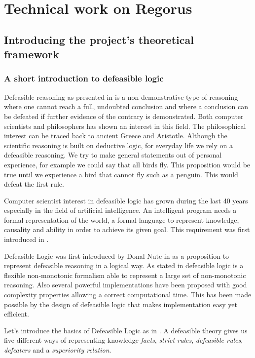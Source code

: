 \documentclass[10pt]{report}
\begin{document}
\newpage
\chapter{Technical work on Regorus}
\section{Introducing the project's theoretical framework}
\subsection{A short introduction to defeasible logic}

Defeasible reasoning as presented in \autocite{koons_defeasible_2005} is a non-demonstrative type of reasoning where one cannot reach a full, undoubted conclusion and where a conclusion can be defeated if further evidence of the contrary is demonstrated. Both computer scientists and philosophers has shown an interest in this field. The philosophical interest can be traced back to ancient Greece and Aristotle. Although the scientific reasoning is built on deductive logic, for everyday life we rely on a defeasible reasoning. We try to make general statements out of personal experience, for example we could say that all birds fly. This proposition would be true until we experience a bird that cannot fly such as a penguin. This would defeat the first rule.

Computer scientist interest in defeasible logic has grown during the last 40 years especially in the field of artificial intelligence. An intelligent program needs a formal representation of the world, a formal language to represent knowledge, causality and ability in order to achieve its given goal. This requirement was first introduced in \autocite{mccarthy1968some}.

Defeasible Logic was first introduced by Donal Nute in \autocite{nute1994defeasible} as a proposition to represent defeasible reasoning in a logical way. As stated in \autocite{ecai2000} defeasible logic is a flexible non-monotonic formalism able to represent a large set of non-monotonic reasoning. Also several powerful implementations have been proposed with good complexity properties allowing a correct computational time. This has been made possible by the design of defeasible logic that makes implementation easy yet efficient.

Let's introduce the basics of Defeasible Logic as in \autocite{RepresentationResultsDefeasibleLogic}. A defeasible theory gives us five different ways of representing knowledge \textit{facts}, \textit{strict rules}, \textit{defeasible rules}, \textit{defeaters} and a \textit{superiority relation}. 
\end{document}
